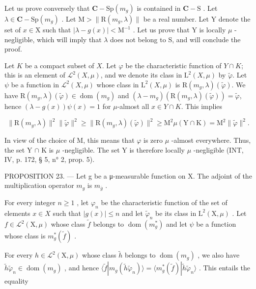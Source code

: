 Let us prove conversely that \(\mathbf{C} - \mathrm{Sp}(m_g)\) is contained in \(\mathbf{C} - \mathrm{S}\) . Let \(\lambda \in \mathbf{C} - \mathrm{Sp}(m_g)\) . Let \(\mathrm{M} > \| \mathrm{R}(m_g, \lambda) \|\) be a real number. Let Y denote the set of \(x \in \mathrm{X}\) such that \(|\lambda - g(x)| < \mathrm{M}^{-1}\) . Let us prove that Y is locally \(\mu\) -negligible, which will imply that \(\lambda\) does not belong to S, and will conclude the proof.

Let \(K\) be a compact subset of \(X\). Let \(\varphi\) be the characteristic function of \(Y \cap K\); this is an element of \(\mathcal{L}^{2}(X,\mu)\), and we denote its class in \(\mathrm{L}^{2}(X,\mu)\) by \(\widetilde{\varphi}\). Let \(\psi\) be a function in \(\mathcal{L}^{2}(X,\mu)\) whose class in \(\mathrm{L}^{2}(X,\mu)\) is \(\mathrm{R}(m_g,\lambda)(\widetilde{\varphi})\). We have \(\mathrm{R}(m_g,\lambda)(\widetilde{\varphi}) \in \operatorname{dom}(m_g)\) and \((\lambda - m_g)(\mathrm{R}(m_g,\lambda)(\widetilde{\varphi})) = \widetilde{\varphi}\), hence \((\lambda - g(x))\psi(x) = 1\) for \(\mu\)-almost all \(x \in Y \cap K\). This implies

\[
\| \mathrm{R} (m _ {g}, \lambda) \| ^ {2} \| \widetilde {\varphi} \| ^ {2} \geqslant \| \mathrm{R} (m _ {g}, \lambda) (\widetilde {\varphi}) \| ^ {2} \geqslant \mathrm{M} ^ {2} \mu (\mathrm{Y} \cap \mathrm{K}) = \mathrm{M} ^ {2} \| \widetilde {\varphi} \| ^ {2}.
\]

In view of the choice of M, this means that \(\varphi\) is zero \(\mu\) -almost everywhere. Thus, the set Y \(\cap\) K is \(\mu\) -negligible. The set Y is therefore locally \(\mu\) -negligible (INT, IV, p. 172, § 5, n° 2, prop. 5).

PROPOSITION 23. --- Let g be a μ-measurable function on X. The adjoint of the multiplication operator \(m_{g}\) is \(m_{\overline{g}}\) .

For every integer \(n \geqslant 1\) , let \(\varphi_{n}\) be the characteristic function of the set of elements \(x \in X\) such that \(|g(x)| \leqslant n\) and let \(\widetilde{\varphi}_{n}\) be its class in \(\mathrm{L}^{2}(\mathrm{X}, \mu)\) . Let \(f \in \mathcal{L}^{2}(\mathrm{X}, \mu)\) whose class \(\widetilde{f}\) belongs to \(\operatorname{dom}(m_{g}^{*})\) and let \(\psi\) be a function whose class is \(m_{g}^{*}(\widetilde{f})\) .

For every \(h \in \mathcal{L}^2(\mathrm{X}, \mu)\) whose class \(\widetilde{h}\) belongs to \(\operatorname{dom}(m_g)\) , we also have \(\widetilde{h}\widetilde{\varphi}_n \in \operatorname{dom}(m_g)\) , and hence \(\langle \widetilde{f} | m_g(\widetilde{h}\widetilde{\varphi}_n) \rangle = \langle m_g^*(\widetilde{f}) | \widetilde{h}\widetilde{\varphi}_n \rangle\) . This entails the equality

